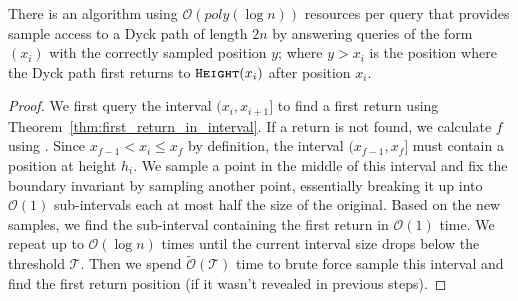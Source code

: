 \begin{theorem}
\label{thm:dyck_first_return_sampling}
There is an algorithm using $\mathcal O(poly(\log n))$ resources per query that provides sample access to a Dyck path of length $2n$
by answering queries of the form $(x_i)$ with the correctly sampled position $y$;
where $y>x_i$ is the position where the Dyck path first returns to $\texttt{\textsc{Height}}(x_i)$ after position $x_i$.
\end{theorem}
\begin{proof}
We first query the interval $(x_i,x_{i+1}]$ to find a first return using Theorem~\ref{thm:first_return_in_interval}.
If a return is not found, we calculate $f$ using .
Since $x_{f-1}<x_i\le x_f$ by definition, the interval $(x_{f-1},x_f]$ must contain a position at height $h_i$.
We sample a point in the middle of this interval and fix the boundary invariant by sampling another point,
essentially breaking it up into $\mathcal O(1)$ sub-intervals each at most half the size of the original.
Based on the new samples, we find the sub-interval containing the first return in $\mathcal O(1)$ time.
We repeat up to $\mathcal O(\log n)$ times until the current interval size drops below the threshold $\mathcal T$.
Then we spend $\tilde{\mathcal O}(\mathcal T)$ time to brute force sample this interval and find the first return position (if it wasn't revealed in previous steps).
\end{proof}
